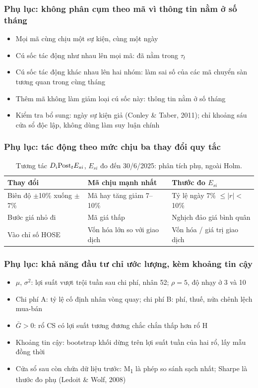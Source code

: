 \documentclass[11pt, xcolor={dvipsnames}, aspectratio=169, usepdftitle=false]{beamer}
\newcommand{\MM}[1]{M\textsubscript{#1}}
\newcommand{\vn}[1]{\text{\normalfont #1}}
\newcommand{\Post}{\vn{Post}}
\begin{document}
\begin{frame}[label=khongCum]
\frametitle{Phụ lục: không phân cụm theo mã vì thông tin nằm ở số tháng}
\begin{itemize}
\item Mọi mã cùng chịu một sự kiện, cùng một ngày
\item Cú sốc tác động như nhau lên mọi mã: đã nằm trong $\tau_t$
\item Cú sốc tác động khác nhau lên hai nhóm: làm sai số của các mã chuyển sàn tương quan trong cùng tháng
\item Thêm mã không làm giảm loại cú sốc này: thông tin nằm ở số tháng
\item Kiểm tra bổ sung: ngày sự kiện giả (Conley \& Taber, 2011); chỉ khoảng sáu cửa sổ độc lập, không dùng làm suy luận chính
\end{itemize}
\end{frame}

\begin{frame}[label=mucChiu]
\frametitle{Phụ lục: tác động theo mức chịu ba thay đổi quy tắc}
\begin{table}
\begin{tabular*}{\textwidth}{@{\extracolsep\fill}lll}
\toprule
Thay đổi & Mã chịu mạnh nhất & Thước đo $E_{si}$\\
\midrule
Biên độ $\pm$10\% xuống $\pm$7\% & Mã hay tăng giảm 7--10\% & Tỷ lệ ngày 7\% $\leq |r| <$ 10\%\\
Bước giá nhỏ đi & Mã giá thấp & Nghịch đảo giá bình quân\\
Vào chỉ số HOSE & Vốn hóa lớn so với giao dịch & Vốn hóa / giá trị giao dịch\\
\bottomrule
\end{tabular*}
\caption{Tương tác $D_i \Post_t E_{si}$, $E_{si}$ đo đến 30/6/2025: phân tích phụ, ngoài Holm.}
\end{table}
\end{frame}

\begin{frame}[label=uocLuongG]
\frametitle{Phụ lục: khả năng đầu tư chỉ ước lượng, kèm khoảng tin cậy}
\begin{itemize}
\item $\mu$, $\sigma^2$: lợi suất vượt trội tuần sau chi phí, nhân 52; $\rho = 5$, độ nhạy ở 3 và 10
\item Chi phí A: tỷ lệ cố định nhân vòng quay; chi phí B: phí, thuế, nửa chênh lệch mua-bán
\item $\bar{G} > 0$: rổ CS có lợi suất tương đương chắc chắn thấp hơn rổ H
\item Khoảng tin cậy: bootstrap khối dừng trên lợi suất tuần của hai rổ, lấy mẫu đồng thời
\item Cửa sổ sau còn chứa dữ liệu trước: \MM{1} là phép so sánh sạch nhất; Sharpe là thước đo phụ (Ledoit \& Wolf, 2008)
\end{itemize}
\end{frame}
\end{document}

